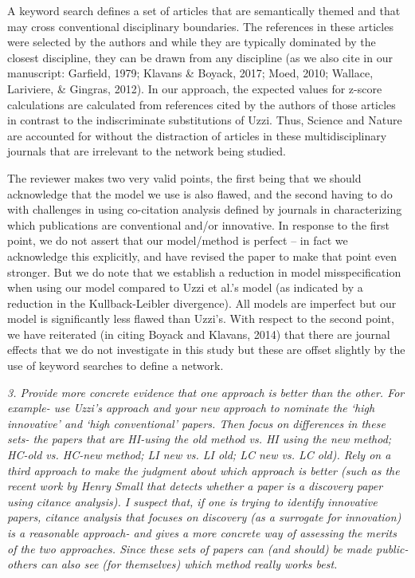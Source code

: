 \documentclass[11pt, oneside]{article}   	%
\begin{document}
A keyword search defines a set of articles that are semantically themed and that may cross conventional disciplinary boundaries. The references in these articles were selected by the authors and while they are typically dominated by the closest discipline, they can be drawn from any discipline (as we also cite in our manuscript: Garfield, 1979; Klavans \& Boyack, 2017; Moed, 2010; Wallace, Lariviere, \& Gingras, 2012). In our approach, the expected values for z-score calculations are calculated from references cited by the authors of those articles in contrast to the indiscriminate substitutions of Uzzi. Thus, Science and Nature are accounted for without the distraction of articles in these multidisciplinary journals that are irrelevant to the network being studied.

The reviewer makes two very valid points, the first being that we should acknowledge that the model we use is also flawed, and the second having to do with challenges in using co-citation analysis defined by journals in characterizing which publications are conventional and/or innovative. In response to the first point, we do not assert that our model/method is perfect -- in fact we acknowledge this explicitly, and have revised the paper to make that point even stronger. But we do note that we establish a reduction in model misspecification when using our model compared to Uzzi et al.'s model (as indicated by a reduction in the Kullback-Leibler divergence). All models are imperfect but our model is significantly less flawed than Uzzi's. With respect to the second point, we have reiterated (in citing Boyack and Klavans, 2014) that there are journal effects that we do not investigate in this study but these are offset slightly by the use of keyword searches to define a network.
 
\emph{3. Provide more concrete evidence that one approach is better than the other.  For example- use Uzzi's approach and your new approach to nominate the `high innovative' and `high conventional' papers.   Then focus on differences in these sets- the papers that are HI-using the old method vs. HI using the new method; HC-old vs. HC-new method; LI new vs. LI old; LC new vs. LC old).  Rely on a third approach to make the judgment about which approach is better (such as the recent work by Henry Small that detects whether a paper is a discovery paper using citance analysis). I suspect that, if one is trying to identify innovative papers, citance analysis that focuses on discovery (as a surrogate for innovation) is a reasonable approach- and gives a more concrete way of assessing the merits of the two approaches. Since these sets of papers can (and should) be made public- others can also see (for themselves) which method really works best.} 
\end{document}
